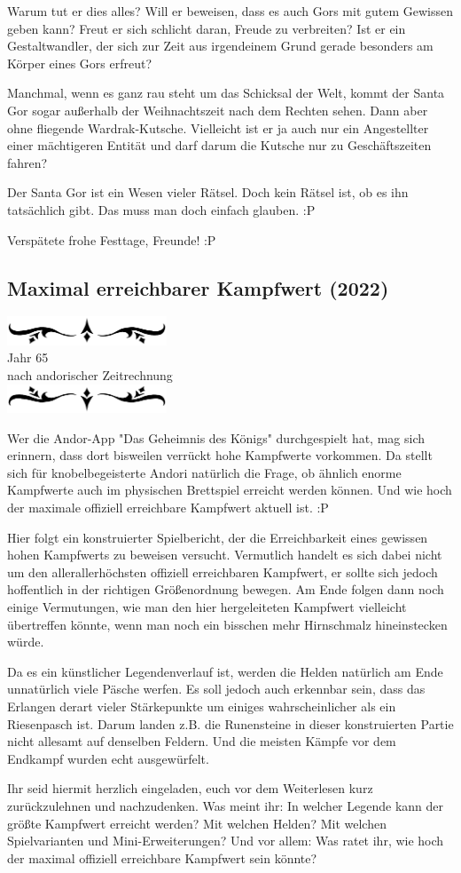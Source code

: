 \documentclass[10pt, a4paper, oneside]{book}
\newcommand{\az}[1]{%
    \begin{center}
        \includegraphics[width=180px]{Das Erbe des Wunderkindes/verzierung1.png}\\
        {\Huge #1} \\
        {nach andorischer Zeitrechnung}\\
        \includegraphics[width=180px]{Das Erbe des Wunderkindes/verzierung2.png}
    \end{center}
    \extramarks{}{#1 a.Z.}
}
\begin{document}
Warum tut er dies alles? Will er beweisen, dass es auch Gors mit gutem Gewissen geben kann? Freut er sich schlicht daran, Freude zu verbreiten? Ist er ein Gestaltwandler, der sich zur Zeit aus irgendeinem Grund gerade besonders am Körper eines Gors erfreut?

Manchmal, wenn es ganz rau steht um das Schicksal der Welt, kommt der Santa Gor sogar außerhalb der Weihnachtszeit nach dem Rechten sehen. Dann aber ohne fliegende Wardrak-Kutsche. Vielleicht ist er ja auch nur ein Angestellter einer mächtigeren Entität und darf darum die Kutsche nur zu Geschäftszeiten fahren?

Der Santa Gor ist ein Wesen vieler Rätsel. Doch kein Rätsel ist, ob es ihn tatsächlich gibt. Das muss man doch einfach glauben. :P\bigskip



Verspätete frohe Festtage, Freunde! :P



\begin{chapterbox}
    \chapter{Maximal erreichbarer Kampfwert (2022)}
    \az{Jahr 65}

    Wer die Andor-App "Das Geheimnis des Königs" durchgespielt hat, mag sich erinnern, dass dort bisweilen verrückt hohe Kampfwerte vorkommen. Da stellt sich für knobelbegeisterte Andori natürlich die Frage, ob ähnlich enorme Kampfwerte auch im physischen Brettspiel erreicht werden können. Und wie hoch der maximale offiziell erreichbare Kampfwert aktuell ist. :P

    Hier folgt ein konstruierter Spielbericht, der die Erreichbarkeit eines gewissen hohen Kampfwerts zu beweisen versucht. Vermutlich handelt es sich dabei nicht um den allerallerhöchsten offiziell erreichbaren Kampfwert, er sollte sich jedoch hoffentlich in der richtigen Größenordnung bewegen. Am Ende folgen dann noch einige Vermutungen, wie man den hier hergeleiteten Kampfwert vielleicht übertreffen könnte, wenn man noch ein bisschen mehr Hirnschmalz hineinstecken würde.

    Da es ein künstlicher Legendenverlauf ist, werden die Helden natürlich am Ende unnatürlich viele Päsche werfen. Es soll jedoch auch erkennbar sein, dass das Erlangen derart vieler Stärkepunkte um einiges wahrscheinlicher als ein Riesenpasch ist. Darum landen z.B. die Runensteine in dieser konstruierten Partie nicht allesamt auf denselben Feldern. Und die meisten Kämpfe vor dem Endkampf wurden echt ausgewürfelt.

    Ihr seid hiermit herzlich eingeladen, euch vor dem Weiterlesen kurz zurückzulehnen und nachzudenken.
    Was meint ihr: In welcher Legende kann der größte Kampfwert erreicht werden? Mit welchen Helden? Mit welchen Spielvarianten und Mini-Erweiterungen?
    Und vor allem: Was ratet ihr, wie hoch der maximal offiziell erreichbare Kampfwert sein könnte?
\end{chapterbox}
\end{document}
